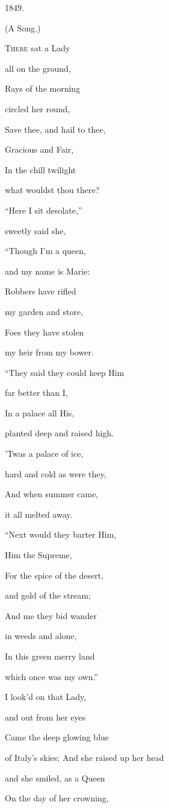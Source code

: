 1849.


(A Song.)

T\textsc{here} sat a Lady

all on the ground,

Rays of the morning

circled her round,

Save thee, and hail to thee,

Gracious and Fair,

In the chill twilight

what wouldst thou there?

``Here I sit desolate,''

sweetly said she,

``Though I'm a queen,

and my name is Marie:

Robbers have rifled

my garden and store,

Foes they have stolen

my heir from my bower. 

``They said they could keep Him

far better than I,

In a palace all His,

planted deep and raised high.

'Twas a palace of ice,

hard and cold as were they,

And when summer came,

it all melted away.

``Next would they barter Him,

Him the Supreme,

For the spice of the desert,

and gold of the stream;

And me they bid wander

in weeds and alone,

In this green merry land

which once was my own.''

I look'd on that Lady,

and out from her eyes

Came the deep glowing blue

of Italy's skies; And she raised up her head

and she smiled, as a Queen

On the day of her crowning,

